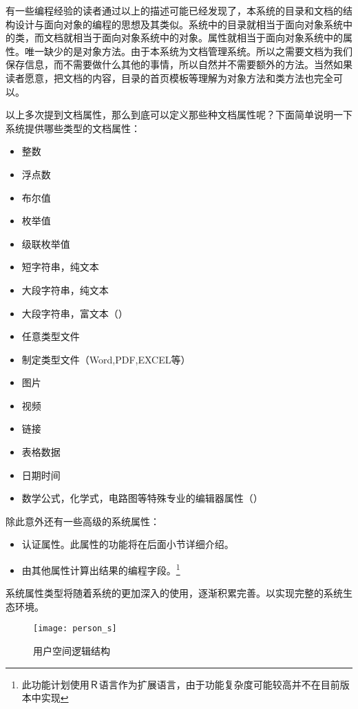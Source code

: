 有一些编程经验的读者通过以上的描述可能已经发现了，本系统的目录和文档的结构设计与面向对象的编程的思想及其类似。系统中的目录就相当于面向对象系统中的类，而文档就相当于面向对象系统中的对象。属性就相当于面向对象系统中的属性。唯一缺少的是对象方法。由于本系统为文档管理系统。所以之需要文档为我们保存信息，而不需要做什么其他的事情，所以自然并不需要额外的方法。当然如果读者愿意，把文档的内容，目录的首页模板等理解为对象方法和类方法也完全可以。

以上多次提到文档属性，那么到底可以定义那些种文档属性呢？下面简单说明一下系统提供哪些类型的文档属性：
\begin{itemize}
\item 整数
\item 浮点数
\item 布尔值
\item 枚举值
\item 级联枚举值
\item 短字符串，纯文本
\item 大段字符串，纯文本
\item 大段字符串，富文本（\smarkdown）
\item 任意类型文件
\item 制定类型文件（Word,PDF,EXCEL等）
\item 图片
\item 视频
\item 链接
\item 表格数据
\item 日期时间
\item 数学公式，化学式，电路图等特殊专业的编辑器属性（）
\end{itemize}
除此意外还有一些高级的系统属性：
\begin{itemize}
\item 认证属性。此属性的功能将在后面小节详细介绍。
\item 由其他属性计算出结果的编程字段。\footnote{此功能计划使用Ｒ语言作为扩展语言，由于功能复杂度可能较高并不在目前版本中实现}
\end{itemize}
系统属性类型将随着系统的更加深入的使用，逐渐积累完善。以实现完整的系统生态环境。
\begin{figure}[H]
  \centering
  \texttt{[image: person\_s]}
  \caption{用户空间逻辑结构}
  \label{fig:xfig11}
\end{figure}


